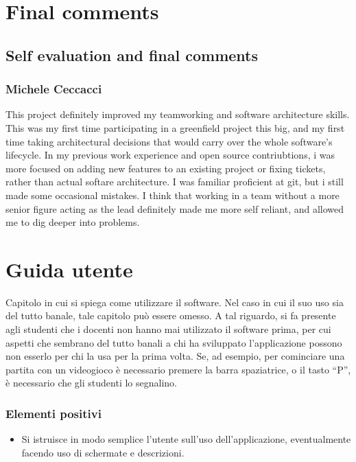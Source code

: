 \documentclass[a4paper,12pt]{report}
\begin{document}
\chapter{Final comments}

\section{Self evaluation and final comments}

\subsection{Michele Ceccacci}
This project definitely improved my teamworking and software architecture skills. 
This was my first time participating in a greenfield project this big, and my first time 
taking architectural decisions that would carry over the whole software's lifecycle. 
In my previous work experience and open source contriubtions, i was more focused on  adding new features 
to an existing project or fixing tickets, rather than actual softare architecture. 
I was familiar proficient at git, but i still made some occasional mistakes.
I think that working in a team without a more senior figure acting as the  lead definitely 
made me more  self reliant, and allowed me to dig deeper into problems.

\appendix
\chapter{Guida utente}

Capitolo in cui si spiega come utilizzare il software. Nel caso in cui il suo uso sia del tutto
banale, tale capitolo può essere omesso.
%
A tal riguardo, si fa presente agli studenti che i docenti non hanno mai utilizzato il software
prima, per cui aspetti che sembrano del tutto banali a chi ha sviluppato l'applicazione possono non
esserlo per chi la usa per la prima volta.
%
Se, ad esempio, per cominciare una partita con un videogioco è necessario premere la barra
spaziatrice, o il tasto ``P'', è necessario che gli studenti lo segnalino.

\subsection*{Elementi positivi}

\begin{itemize}
 \item Si istruisce in modo semplice l'utente sull'uso dell'applicazione, eventualmente facendo uso di schermate e descrizioni.
\end{itemize}
\end{document}

